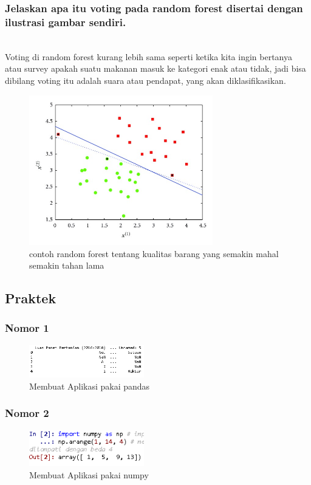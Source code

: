 \subsubsection{Jelaskan apa itu voting pada random forest disertai dengan ilustrasi gambar sendiri.}
\hfill\\
Voting di random forest kurang lebih sama seperti ketika kita ingin bertanya atau survey apakah suatu makanan masuk ke kategori enak atau tidak, jadi bisa dibilang voting itu adalah suara atau pendapat, yang akan diklasifikasikan.
\begin{figure}[H]
	\centering
	\includegraphics[width=8cm]{figures/1174079/3/klasifikasirandomforest.png}
	\caption{contoh random forest tentang kualitas barang yang semakin mahal semakin tahan lama}
\end{figure}

\subsection{Praktek}

\subsubsection{Nomor 1}
\hfill\break

\begin{figure}[H]
\centerline{\includegraphics[width=5cm]{figures/1174079/3/praktek0.PNG}}
\caption{Membuat Aplikasi pakai pandas}
\label{labelgambar}
\end{figure}

\subsubsection{Nomor 2}
\hfill\break

\begin{figure}[H]
\centerline{\includegraphics[width=5cm]{figures/1174079/3/praktek1.PNG}}
\caption{Membuat Aplikasi pakai numpy}
\label{labelgambar}
\end{figure}

